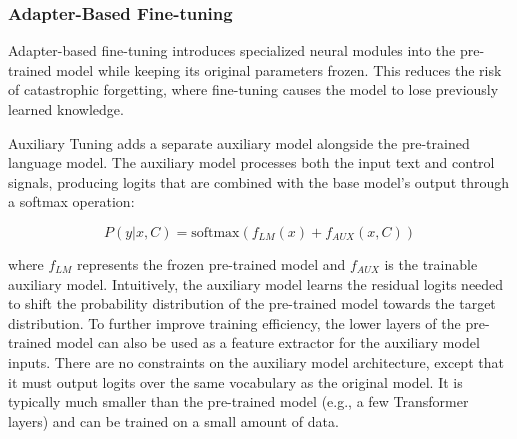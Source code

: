 \subsubsection{Adapter-Based Fine-tuning}

Adapter-based fine-tuning introduces specialized neural modules into the pre-trained model while keeping its original parameters frozen. This reduces the risk of catastrophic forgetting, where fine-tuning causes the model to lose previously learned knowledge.

Auxiliary Tuning \cite{zeldes2020technicalreportauxiliarytuning} adds a separate auxiliary model alongside the pre-trained language model. 
The auxiliary model processes both the input text and control signals, producing logits that are combined with the base model's output through a softmax operation:

\begin{equation}
    P(y|x,C) = \text{softmax}(f_{LM}(x) + f_{AUX}(x,C))
\end{equation}

where $f_{LM}$ represents the frozen pre-trained model and $f_{AUX}$ is the trainable auxiliary model. 
Intuitively, the auxiliary model learns the residual logits needed to shift the probability distribution of the pre-trained model towards the target distribution.
To further improve training efficiency, the lower layers of the pre-trained model can also be used as a feature extractor for the auxiliary model inputs. 
There are no constraints on the auxiliary model architecture, except that it must output logits over the same vocabulary as the original model.
It is typically much smaller than the pre-trained model (e.g., a few Transformer layers) and can be trained on a small amount of data.

